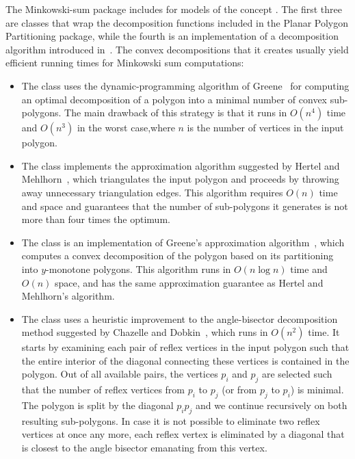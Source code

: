 The Minkowski-sum package includes for models of the concept
. The first three are classes that wrap
the decomposition functions included in the Planar Polygon Partitioning
package, while the fourth is an implementation of a decomposition algorithm
introduced in~\cite{???}. The convex decompositions that it creates
usually yield efficient running times for Minkowski sum computations:
\begin{itemize}
\item
The class  uses the dynamic-programming
algorithm of Greene~\cite{g-dpcp-83} for computing an optimal decomposition
of a polygon into a minimal number of convex sub-polygons. The main drawback
of this strategy is that it runs in $O(n^4)$ time and $O(n^3)$ in the worst
case,where $n$ is the number of vertices in the input polygon.
%
\item
The class  implements the
approximation algorithm suggested by Hertel and Mehlhorn~\cite{hm-ftsp-83},
which triangulates the input polygon and proceeds by throwing away
unnecessary triangulation edges.
This algorithm requires $O(n)$ time and space and guarantees that
the number of sub-polygons it generates is not more than four
times the optimum.
%
\item
The class  is an implementation of
Greene's approximation algorithm~\cite{g-dpcp-83}, which computes a
convex decomposition of the polygon based on its partitioning into
$y$-monotone polygons. This algorithm runs in $O(n \log n)$ time
and $O(n)$ space, and has the same approximation guarantee as
Hertel and Mehlhorn's algorithm.
%
\item
The class  uses
a heuristic improvement to the angle-bisector decomposition method
suggested by Chazelle and Dobkin~\cite{cd-ocd-85}, which runs in
$O(n^2)$ time. It starts by examining each pair of reflex vertices
in the input polygon such that the entire interior of the diagonal
connecting these vertices is contained in the polygon. Out of all
available pairs, the vertices $p_i$ and $p_j$ are selected such
that the number of reflex vertices from $p_i$ to $p_j$ (or from
$p_j$ to $p_i$) is minimal. The polygon is split by the diagonal
$p_i p_j$ and we continue recursively on both resulting
sub-polygons. In case it is not possible to eliminate two reflex
vertices at once any more, each reflex vertex is eliminated by a
diagonal that is closest to the angle bisector emanating from this
vertex.
\end{itemize}


